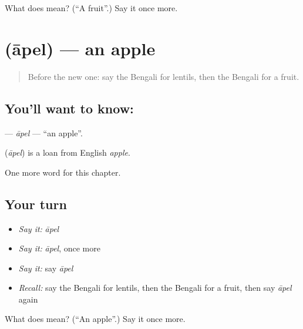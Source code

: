 \begin{tcolorbox}[breakable,colback=teal!4,colframe=teal!35!black,title={Before you move on}]
What does  mean? (\textquotedblleft{}A fruit\textquotedblright{}.) Say it once more.
\end{tcolorbox}
\section[\texorpdfstring{\bn{আপেল} (āpel)}{আপেল (āpel)}]{ (āpel) — an apple}

\label{lesson:BN-C56-apel}



\begin{quote}
Before the new one: say the Bengali for lentils, then the Bengali for a fruit.
\end{quote}

\subsection*{You'll want to know: }
\textbf{} — \emph{āpel} — \textquotedblleft{}an apple\textquotedblright{}.

\begin{cousinweb}
\textbf{} (\emph{āpel}) is a loan from English \emph{apple}.
\end{cousinweb}

\begin{grammarlens}[title={What you've built}]
One more word for this chapter.
\end{grammarlens}

\subsection*{Your turn}
\begin{itemize}
\raggedright
  \item \emph{Say it:} \emph{āpel}
  \item \emph{Say it:} \emph{āpel}, once more
  \item \emph{Say it:} say \emph{āpel}
  \item \emph{Recall:} say the Bengali for lentils, then the Bengali for a fruit, then say \emph{āpel} again
\end{itemize}

\begin{tcolorbox}[breakable,colback=teal!4,colframe=teal!35!black,title={Before you move on}]
What does  mean? (\textquotedblleft{}An apple\textquotedblright{}.) Say it once more.
\end{tcolorbox}
